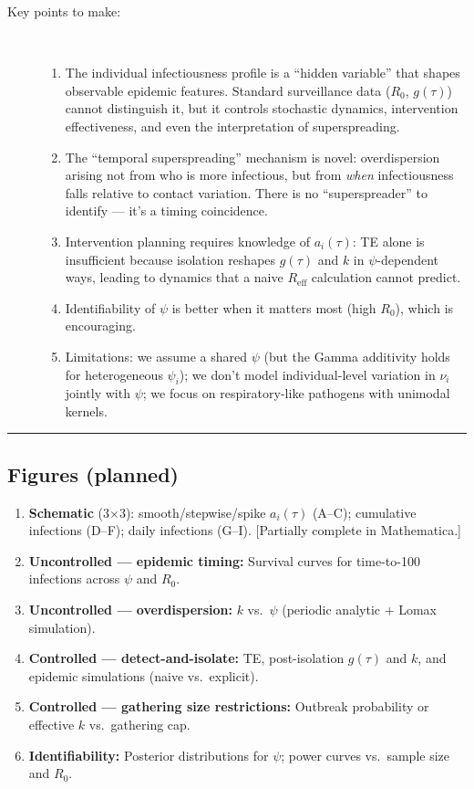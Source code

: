 \begin{description}
    \item[Key points to make:]~
    \begin{enumerate}
        \item The individual infectiousness profile is a ``hidden variable'' that shapes observable epidemic features. Standard surveillance data ($R_0$, $g(\tau)$) cannot distinguish it, but it controls stochastic dynamics, intervention effectiveness, and even the interpretation of superspreading.
        \item The ``temporal superspreading'' mechanism is novel: overdispersion arising not from who is more infectious, but from \textit{when} infectiousness falls relative to contact variation. There is no ``superspreader'' to identify --- it's a timing coincidence.
        \item Intervention planning requires knowledge of $a_i(\tau)$: TE alone is insufficient because isolation reshapes $g(\tau)$ and $k$ in $\psi$-dependent ways, leading to dynamics that a naive $R_\text{eff}$ calculation cannot predict.
        \item Identifiability of $\psi$ is better when it matters most (high $R_0$), which is encouraging.
        \item Limitations: we assume a shared $\psi$ (but the Gamma additivity holds for heterogeneous $\psi_i$); we don't model individual-level variation in $\nu_i$ jointly with $\psi$; we focus on respiratory-like pathogens with unimodal kernels.
    \end{enumerate}
\end{description}

\noindent\rule{\textwidth}{0.4pt}

\subsection*{Figures (planned)}

\begin{enumerate}
    \item \textbf{Schematic} (3$\times$3): smooth/stepwise/spike $a_i(\tau)$ (A--C); cumulative infections (D--F); daily infections (G--I). [Partially complete in Mathematica.]
    \item \textbf{Uncontrolled --- epidemic timing:} Survival curves for time-to-100 infections across $\psi$ and $R_0$.
    \item \textbf{Uncontrolled --- overdispersion:} $k$ vs.\ $\psi$ (periodic analytic + Lomax simulation).
    \item \textbf{Controlled --- detect-and-isolate:} TE, post-isolation $g(\tau)$ and $k$, and epidemic simulations (naive vs.\ explicit).
    \item \textbf{Controlled --- gathering size restrictions:} Outbreak probability or effective $k$ vs.\ gathering cap.
    \item \textbf{Identifiability:} Posterior distributions for $\psi$; power curves vs.\ sample size and $R_0$.
\end{enumerate}

\clearpage
